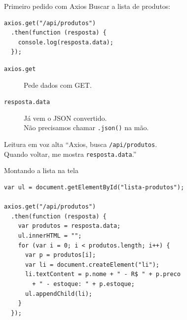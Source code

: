 \documentclass[aspectratio=169,11pt]{beamer}
\begin{document}
\begin{frame}[fragile]{Primeiro pedido com Axios}
  Buscar a lista de produtos:

\begin{lstlisting}[basicstyle=\ttfamily\footnotesize]
axios.get("/api/produtos")
  .then(function (resposta) {
    console.log(resposta.data);
  });
\end{lstlisting}

  \vspace{0.5em}
  \begin{description}
    \item[\texttt{axios.get}] Pede dados com GET.
    \item[\texttt{resposta.data}] Já vem o JSON convertido.\\
      Não precisamos chamar \texttt{.json()} na mão.
  \end{description}

  \vspace{0.4em}
  \begin{block}{Leitura em voz alta}
    ``Axios, busca \texttt{/api/produtos}.\\
    Quando voltar, me mostra \texttt{resposta.data}.''
  \end{block}
\end{frame}

\begin{frame}[fragile]{Montando a lista na tela}
\begin{lstlisting}[basicstyle=\ttfamily\footnotesize]
var ul = document.getElementById("lista-produtos");

axios.get("/api/produtos")
  .then(function (resposta) {
    var produtos = resposta.data;
    ul.innerHTML = "";
    for (var i = 0; i < produtos.length; i++) {
      var p = produtos[i];
      var li = document.createElement("li");
      li.textContent = p.nome + " - R$ " + p.preco
        + " - estoque: " + p.estoque;
      ul.appendChild(li);
    }
  });
\end{lstlisting}
\end{frame}
\end{document}
